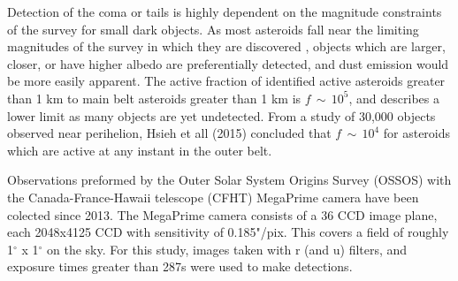 \documentclass[iop,apj]{emulateapj}
\begin{document}
%	





Detection of the coma or tails is highly dependent on the magnitude constraints of the survey for small dark objects. As most asteroids fall near the limiting magnitudes of the survey in which they are discovered \cite{active asteroids}, objects which are larger, closer, or have higher albedo are preferentially detected, and dust emission would be more easily apparent. The active fraction of identified active asteroids greater than 1 km to main belt asteroids greater than 1 km is $f \, \sim \, 10^5$, and describes a lower limit as many objects are yet undetected. \cite{in AA, may be other source} From a study of 30,000 objects observed near perihelion, \cite{} Hsieh et all (2015) concluded that $f \, \sim \, 10^4$ for asteroids which are active at any instant in the outer belt.


Observations preformed by the Outer Solar System Origins Survey (OSSOS) with the Canada-France-Hawaii telescope (CFHT) MegaPrime camera have been colected since 2013. The MegaPrime camera consists of a 36 CCD image plane, each 2048x4125 CCD with sensitivity of 0.185"/pix. This covers a field of roughly 1$^{\circ}$ x 1$^{\circ}$ on the sky. For this study, images taken with r (and u) filters, and exposure times greater than 287s were used to make detections.






\end{document}

